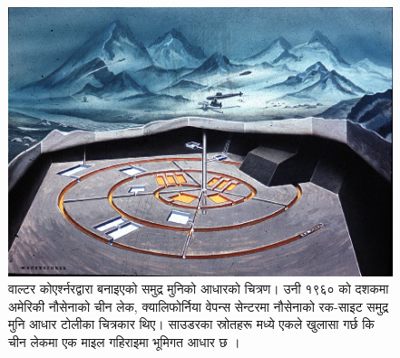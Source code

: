 \documentclass[10pt,twocolumn,letterpaper]{article}
\begin{document}
\begin{figure}[t]
\begin{center}
   \includegraphics[width=1\linewidth]{undersea.jpg}
\end{center}
   \caption{वाल्टर कोएर्श्नरद्वारा बनाइएको समुद्र मुनिको आधारको चित्रण। उनी १९६० को दशकमा अमेरिकी नौसेनाको चीन लेक, क्यालिफोर्निया वेपन्स सेन्टरमा नौसेनाको रक-साइट समुद्र मुनि आधार टोलीका चित्रकार थिए। साउडरका स्रोतहरू मध्ये एकले खुलासा गर्छ कि चीन लेकमा एक माइल गहिराइमा भूमिगत आधार छ \cite{22,23}।}
\label{fig:5}
\label{fig:onecol}
\end{figure}
\end{document}
